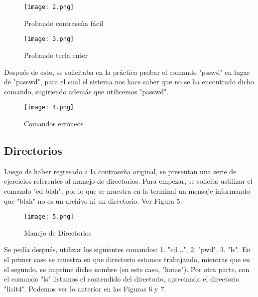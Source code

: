 \documentclass[
  letterpaper, 
  maincolor=black,
  sectioncolor=black!90,
  subsectioncolor=black!70,
  itemtextcolor=black!40,
]{fortysecondscv}
\begin{document}
\begin{center}
    \begin{figure}[H]
    \centering
    \texttt{[image: 2.png]}
    \caption{Probando contraseña fácil}
    \label{fig:1.png}
    \end{figure}
\end{center}

\begin{center}
    \begin{figure}[H]
    \centering
    \texttt{[image: 3.png]}
    \caption{Probando tecla enter}
    \label{fig:1.png}
    \end{figure}
\end{center}


{Después de esto, se solicitaba en la práctica probar el comando "psswd" en lugar de "passwd", para el cual el sistema nos hace saber que no se ha encontrado dicho comando, sugiriendo además que utilicemos "passwd".}

\begin{center}
    \begin{figure}[H]
    \centering
    \texttt{[image: 4.png]}
    \caption{Comandos erróneos}
    \label{fig:1.png}
    \end{figure}
\end{center}

\subsection{Directorios}

{Luego de haber regresado a la contraseña original, se presentan una serie de ejercicios referentes al manejo de directorios. Para empezar, se solicita ustilizar el comando "cd blah", por lo que se muestra en la terminal un mensaje informando que "blah" no es un archivo ni un directorio. Ver Figura 5.}

\begin{center}
    \begin{figure}[H]
    \centering
    \texttt{[image: 5.png]}
    \caption{Manejo de Directorios}
    \label{fig:2.png}
    \end{figure}
\end{center}

{Se pedía después, utilizar los siguientes comandos: 1. "cd ..", 2. "pwd", 3. "ls". En el primer caso se muestra en que directorio estamos trabajando, mientras que en el segundo, se imprime dicho nombre (en este caso, "home"). Por otra parte, con el comando "ls" listamos el contendido del directorio, apreciando el directorio "licit4". Podemos ver lo anterior en las Figuras 6 y 7.}
\end{document}

